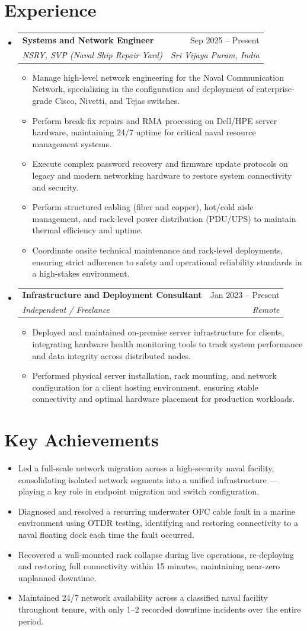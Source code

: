 \documentclass[letterpaper,11pt]{article}
\makeatletter
\newcommand{\resumeItem}[1]{
  \item\small{
    {#1 \vspace{-2pt}}
  }
}
\newcommand{\resumeSubheading}[4]{
  \vspace{-2pt}\item
    \begin{tabular*}{0.97\textwidth}[t]{l@{\extracolsep{\fill}}r}
      \textbf{#1} & #2 \\
      \textit{\small#3} & \textit{\small #4} \\
    \end{tabular*}\vspace{-7pt}
}
\newcommand{\resumeSubHeadingListStart}{\begin{itemize}[leftmargin=0.15in, label={}]}
\newcommand{\resumeSubHeadingListEnd}{\end{itemize}}
\newcommand{\resumeItemListStart}{\begin{itemize}}
\newcommand{\resumeItemListEnd}{\end{itemize}\vspace{-5pt}}
\makeatother
\begin{document}
\section{Experience}
  \resumeSubHeadingListStart

    \resumeSubheading
      {Systems and Network Engineer}{Sep 2025 -- Present}
      {NSRY, SVP (Naval Ship Repair Yard)}{Sri Vijaya Puram, India}
\resumeItemListStart
        \resumeItem{Manage high-level network engineering for the Naval Communication Network, specializing in the configuration and deployment of enterprise-grade Cisco, Nivetti, and Tejas switches.}
        \resumeItem{Perform break-fix repairs and RMA processing on Dell/HPE server hardware, maintaining 24/7 uptime for critical naval resource management systems.}
        \resumeItem{Execute complex password recovery and firmware update protocols on legacy and modern networking hardware to restore system connectivity and security.}
        \resumeItem{Perform structured cabling (fiber and copper), hot/cold aisle management, and rack-level power distribution (PDU/UPS) to maintain thermal efficiency and uptime.}
        \resumeItem{Coordinate onsite technical maintenance and rack-level deployments, ensuring strict adherence to safety and operational reliability standards in a high-stakes environment.}
      \resumeItemListEnd
      
\resumeSubheading
      {Infrastructure and Deployment Consultant}{Jan 2023 -- Present}
      {Independent / Freelance}{Remote}
      \resumeItemListStart
        \resumeItem{Deployed and maintained on-premise server infrastructure for clients, integrating hardware health monitoring tools to track system performance and data integrity across distributed nodes.}
        \resumeItem{Performed physical server installation, rack mounting, and network configuration for a client hosting environment, ensuring stable connectivity and optimal hardware placement for production workloads.}
      \resumeItemListEnd

  \resumeSubHeadingListEnd

\section{Key Achievements}
    \resumeItemListStart
    \resumeItem{Led a full-scale network migration across a high-security naval facility, consolidating isolated network segments into a unified infrastructure — playing a key role in endpoint migration and switch configuration.}
    \resumeItem{Diagnosed and resolved a recurring underwater OFC cable fault in a marine environment using OTDR testing, identifying and restoring connectivity to a naval floating dock each time the fault occurred.}
    \resumeItem{Recovered a wall-mounted rack collapse during live operations, re-deploying and restoring full connectivity within 15 minutes, maintaining near-zero unplanned downtime.}
    \resumeItem{Maintained 24/7 network availability across a classified naval facility throughout tenure, with only 1–2 recorded downtime incidents over the entire period.}
    \resumeItemListEnd
\end{document}
